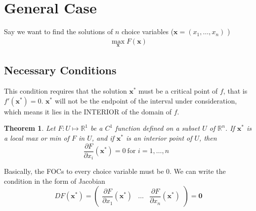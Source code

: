 \documentclass[10pt,a4paper]{book}
\newtheorem{theorem}{Theorem}[section]
\theoremstyle{definition}\newtheorem{definition}{Definition}
\theoremstyle{definition}\newtheorem{fact}{Fact}
\theoremstyle{definition}\newtheorem{ex}{Ex.}
\theoremstyle{definition}\newtheorem{project}{Project}
\theoremstyle{definition}\newtheorem{problem}{Problem}
\theoremstyle{definition}\newtheorem{example}{Example}
\numberwithin{theorem}{chapter}
\numberwithin{corollary}{chapter}
\numberwithin{assumption}{chapter}
\numberwithin{definition}{chapter}
\numberwithin{prop}{chapter}
\numberwithin{notation}{chapter}
\numberwithin{problem}{chapter}
\numberwithin{example}{chapter}
\numberwithin{fact}{chapter}
\numberwithin{ex}{chapter}
\newenvironment{ftheorem}
{\begin{mdframed}\begin{theorem}}
		{\end{theorem}\end{mdframed}}
\def\R{\mathbb R}
\def\0{\mathbf 0}
\def\R{\mathbb R}
\def\x{\mathbf x}
\begin{document}
	\section{General Case}
	Say we want to find the solutions of $n$ choice variables ($\x = (x_1, \dots, x_n)$ )
	\begin{align*}
		\max_{\x} F(\x) 
	\end{align*}
	
	\subsection{Necessary Conditions}
	This condition requires that the solution $\x^*$ must be a critical point of $f$, that is $f'(\x^*)=0$. $\x^*$ will not be the endpoint of the interval under consideration, which means it lies in the INTERIOR of the domain of $f$. 
	
	\begin{ftheorem}
		Let $F: U \mapsto \R^1$ be a $C^1$ function defined on a subset $U$ of $\R^n$. If $\x^*$ is a local max or min of $F$ in $U$, and if $\x^*$ is an interior point of $U$, then
		\begin{equation*}
			\frac{\partial F}{\partial x_i} (\x^*) = 0 \ \text{for $i = 1, \dots, n$ }
		\end{equation*}
	\end{ftheorem}
	Basically, the FOCs to every choice variable must be 0. We can write the condition in the form of Jacobian
	\begin{equation*}
		D F(\x^*) = 
		\begin{pmatrix}
			\dfrac{\partial F}{\partial x_1} (\x^*)            & \dots  & \dfrac{\partial F}{ \partial x_n} (\x^*) 
		\end{pmatrix} = \0
	\end{equation*}
	
\end{document}
